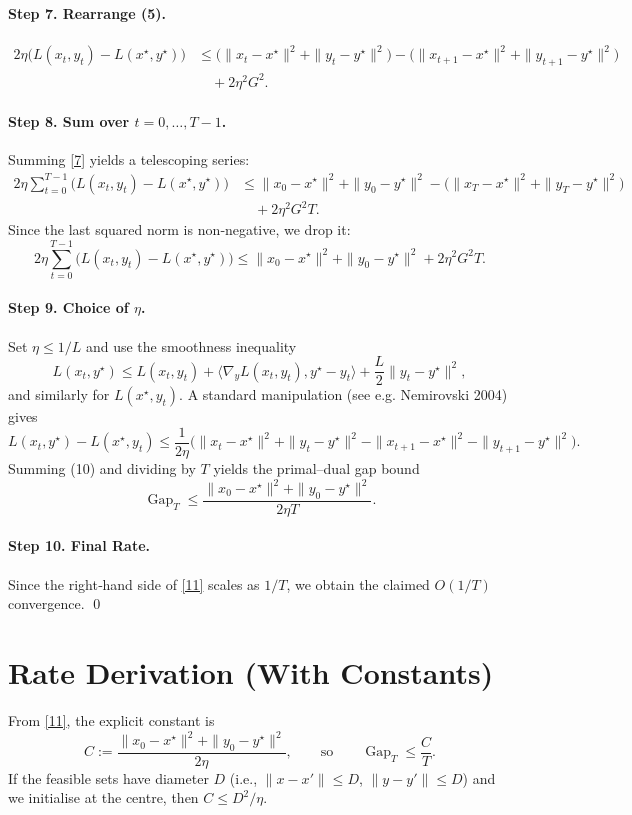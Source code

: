 \documentclass{article}
\newcommand{\gap}{\operatorname{Gap}}
\begin{document}
\paragraph{Step 7. Rearrange (5).}
\begin{align}
2\eta\big(L(x_t,y_t)-L(x^\star,y^\star)\big)
&\le \big(\|x_t-x^\star\|^2+\|y_t-y^\star\|^2\big)
   -\big(\|x_{t+1}-x^\star\|^2+\|y_{t+1}-y^\star\|^2\big) \nonumber\\
&\quad +2\eta^2 G^2. \tag{7}
\end{align}
\paragraph{Step 8. Sum over $t=0,\dots,T-1$.}
Summing \eqref{7} yields a telescoping series:
\begin{align}
2\eta\sum_{t=0}^{T-1}\big(L(x_t,y_t)-L(x^\star,y^\star)\big)
&\le \|x_0-x^\star\|^2+\|y_0-y^\star\|^2
   -\big(\|x_T-x^\star\|^2+\|y_T-y^\star\|^2\big) \nonumber\\
&\quad +2\eta^2 G^2 T. \tag{8}
\end{align}
Since the last squared norm is non‑negative, we drop it:
\[
2\eta\sum_{t=0}^{T-1}\big(L(x_t,y_t)-L(x^\star,y^\star)\big)
\le \|x_0-x^\star\|^2+\|y_0-y^\star\|^2+2\eta^2 G^2 T. \tag{9}
\]
\paragraph{Step 9. Choice of $\eta$.}
Set $\eta\le 1/L$ and use the smoothness inequality
\[
L(x_t,y^\star)\le L(x_t,y_t)+\langle\nabla_y L(x_t,y_t),y^\star-y_t\rangle
        +\frac{L}{2}\|y_t-y^\star\|^2,
\]
and similarly for $L(x^\star,y_t)$. A standard manipulation (see e.g. Nemirovski 2004) gives
\[
L(x_t,y^\star)-L(x^\star,y_t)\le \frac{1}{2\eta}
\Big(\|x_t-x^\star\|^2+\|y_t-y^\star\|^2
      -\|x_{t+1}-x^\star\|^2-\|y_{t+1}-y^\star\|^2\Big). \tag{10}
\]
Summing (10) and dividing by $T$ yields the primal–dual gap bound
\[
\gap_T\le\frac{\|x_0-x^\star\|^2+\|y_0-y^\star\|^2}{2\eta T}. \tag{11}
\]
\paragraph{Step 10. Final Rate.}
Since the right‑hand side of \eqref{11} scales as $1/T$, we obtain the claimed $O(1/T)$ convergence. \qed

\section*{Rate Derivation (With Constants)}
From \eqref{11}, the explicit constant is
\[
C:=\frac{\|x_0-x^\star\|^2+\|y_0-y^\star\|^2}{2\eta},
\qquad\text{so}\qquad
\gap_T\le \frac{C}{T}.
\]
If the feasible sets have diameter $D$ (i.e., $\|x-x'\|\le D$, $\|y-y'\|\le D$) and we initialise at the centre, then $C\le D^2/\eta$.
\end{document}
